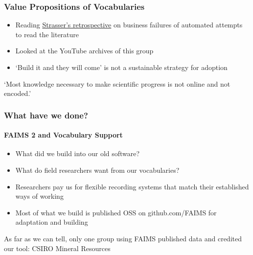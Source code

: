 \documentclass[
	aspectratio=169, %
	12pt, %
	t, %
]{beamer}
\begin{document}
\begin{frame}
	\frametitle{Value Propositions of Vocabularies}

\begin{itemize}
    \item Reading \href{https://markusstrasser.org/p/bcd8bded-7136-4bb4-8f97-e8a3a7b6d926/}{Strasser's retrospective} on business failures of automated attempts to read the literature \parencite*{Strasser2021-zx}
    \item Looked at the YouTube archives of this group
    \item `Build it and they will come' is not a sustainable strategy for adoption
\end{itemize}

\medskip

\begin{exampleblock}{`Most knowledge necessary to make scientific progress is not online and not encoded.'}
\parencite{Strasser2021-zx}
					\end{exampleblock}


\end{frame}


\begin{frame}
	\frametitle{What have we done?}
 	\framesubtitle{FAIMS 2 and Vocabulary Support}


\begin{itemize}
    \item What did we build into our old software?
    \item What do field researchers want from our vocabularies?
    \item Researchers pay us for flexible recording systems that match their established ways of working
    \item Most of what we build is published OSS on github.com/FAIMS for adaptation and building

\end{itemize}

\medskip


As far as we can tell, only one group using FAIMS published data and credited our tool: CSIRO Mineral Resources  \parencite{Noble2017-lz}

\end{frame}
\end{document}
